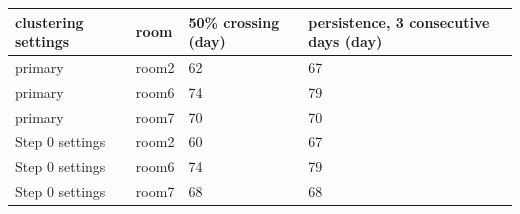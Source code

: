 \begin{tabular}{llll}
\hline
clustering settings & room & 50\% crossing (day) & persistence, 3 consecutive days (day) \\
\hline
primary & room2 & 62 & 67 \\
primary & room6 & 74 & 79 \\
primary & room7 & 70 & 70 \\
Step 0 settings & room2 & 60 & 67 \\
Step 0 settings & room6 & 74 & 79 \\
Step 0 settings & room7 & 68 & 68 \\
\hline
\end{tabular}
